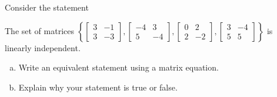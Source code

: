 
\begin{exerciseStatement}


Consider the statement 
\begin{center}\begin{minipage}{0.8\textwidth}
 The set of matrices \( \left\{ \left[\begin{array}{cc}
3 & -1 \\
3 & -3
\end{array}\right] , \left[\begin{array}{cc}
-4 & 3 \\
5 & -4
\end{array}\right] , \left[\begin{array}{cc}
0 & 2 \\
2 & -2
\end{array}\right] , \left[\begin{array}{cc}
3 & -4 \\
5 & 5
\end{array}\right] \right\} \) is linearly independent.
\end{minipage}\end{center}
    


\begin{enumerate}[(a)]
\item  Write an equivalent statement using a matrix equation.
\item  Explain why your statement is true or false.
\end{enumerate}
    
\end{exerciseStatement}
    
